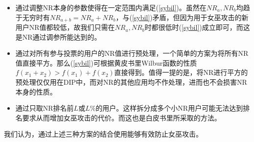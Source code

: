 \begin{itemize}
	\item 通过调整NR本身的参数使得在一定范围内满足(\ref{sybil})。虽然在$NR_a,NR_b$均趋于无穷时有$NR_{a+b}=NR_a+NR_b$，与(\ref{sybil})矛盾，但因为用于女巫攻击的新用户NR值都较低，故我们只需在$NR_a,NR_b$时都很低时(\ref{sybil})成立即可，而这是NR通过调参所能达到的。
	
	\item 通过对所有参与投票的用户的NR值进行预处理，一个简单的方案为将所有NR值直接平方。那么(\ref{sybil})可根据黄皮书\cite{Nabulasyellowpaper}里Wilbur函数的性质$f(x_1+x_2)>f(x_1)+f(x_2)$直接得到。值得一提的是，将NR进行平方的预处理仅仅用在DIP中，而对NR的其他应用均不作处理，进而也不会损害NR本身的性质。
	
	\item 通过只取NR排名前$L$或$L\%$的用户。这样拆分成多个小NR用户可能无法达到排名要求从而增加女巫攻击的代价。而这也是白皮书\cite{Nabulaswhitepaper}里所采取的方法。
\end{itemize}
我们认为，通过上述三种方案的结合使用能够有效防止女巫攻击。